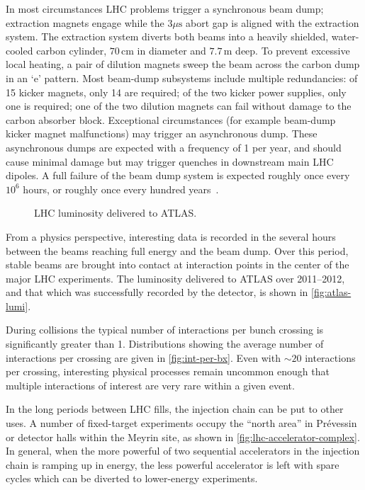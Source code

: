 In most circumstances LHC problems trigger a synchronous beam dump; extraction magnets engage while the $3 \mu\text{s}$ abort gap is aligned with the extraction system.
The extraction system diverts both beams into a heavily shielded, water-cooled carbon cylinder, $70\,\mathrm{cm}$ in diameter and $7.7\,\text{m}$ deep.
To prevent excessive local heating, a pair of dilution magnets sweep the beam across the carbon dump in an `e' pattern.
Most beam-dump subsystems include multiple redundancies: of 15 kicker magnets, only 14 are required; of the two kicker power supplies, only one is required; one of the two dilution magnets can fail without damage to the carbon absorber block.
Exceptional circumstances (for example beam-dump kicker magnet malfunctions) may trigger an asynchronous dump.
These asynchronous dumps are expected with a frequency of 1 per year, and should cause minimal damage but may trigger quenches in downstream main LHC dipoles.
A full failure of the beam dump system is expected roughly once every $10^6$ hours, or roughly once every hundred years~\cite{lhc-machine}.

\begin{figure}
  \caption[LHC Luminosity Delivered to ATLAS]{%
    LHC luminosity delivered to ATLAS.}
\end{figure}

From a physics perspective, interesting data is recorded in the several hours between the beams reaching full energy and the beam dump.
Over this period, stable beams are brought into contact at interaction points in the center of the major LHC experiments.
The luminosity delivered to ATLAS over 2011--2012, and that which was successfully recorded by the detector, is shown in \cref{fig:atlas-lumi}.

During collisions the typical number of interactions per bunch crossing is significantly greater than 1. Distributions showing the average number of interactions per crossing are given in \cref{fig:int-per-bx}.
Even with $\sim 20$ interactions per crossing, interesting physical processes remain uncommon enough that multiple interactions of interest are very rare within a given event.


In the long periods between LHC fills, the injection chain can be put to other uses.
A number of fixed-target experiments occupy the ``north area'' in Pr\'evessin or detector halls within the Meyrin site, as shown in \cref{fig:lhc-accelerator-complex}.
In general, when the more powerful of two sequential accelerators in the injection chain is ramping up in energy, the less powerful accelerator is left with spare cycles which can be diverted to lower-energy experiments.
